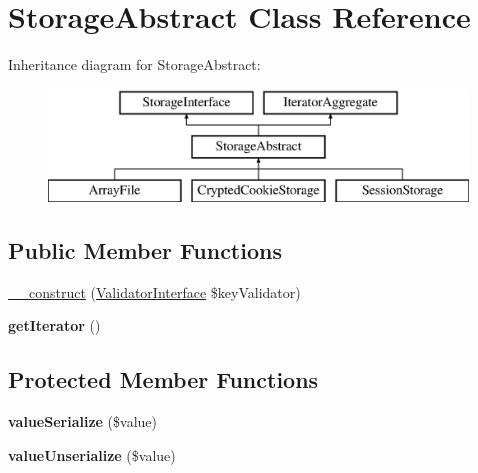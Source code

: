 \hypertarget{class_pes_1_1_storage_1_1_storage_abstract}{}\section{Storage\+Abstract Class Reference}
\label{class_pes_1_1_storage_1_1_storage_abstract}
Inheritance diagram for Storage\+Abstract\+:\begin{figure}[H]
\begin{center}
\leavevmode
\includegraphics[height=3.000000cm]{class_pes_1_1_storage_1_1_storage_abstract}
\end{center}
\end{figure}
\subsection*{Public Member Functions}
\begin{DoxyCompactItemize}
\item 
\mbox{\hyperlink{class_pes_1_1_storage_1_1_storage_abstract_ab580542037647e014bb7213e732ad5b1}{\+\_\+\+\_\+construct}} (\mbox{\hyperlink{interface_pes_1_1_validator_1_1_validator_interface}{Validator\+Interface}} \$key\+Validator)
\item 
\mbox{\label{class_pes_1_1_storage_1_1_storage_abstract_a7a9f937c2958e6f4dd7b030f86fb70b7}} 
{\bfseries get\+Iterator} ()
\end{DoxyCompactItemize}
\subsection*{Protected Member Functions}
\begin{DoxyCompactItemize}
\item 
\mbox{\label{class_pes_1_1_storage_1_1_storage_abstract_aea8e95f499b576adb1fd36a5e9f4253f}} 
{\bfseries value\+Serialize} (\$value)
\item 
\mbox{\label{class_pes_1_1_storage_1_1_storage_abstract_aa6bd75437810735bd4f0990dc70cbf08}} 
{\bfseries value\+Unserialize} (\$value)
\end{DoxyCompactItemize}
